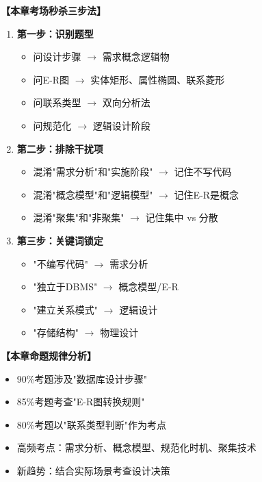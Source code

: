 \documentclass[12pt, a4paper]{article}
\newenvironment{bluebox}[1]{%
  \begin{trivlist}
  \item[\hskip\labelsep \textbf{#1}]
  \setlength{\parskip}{0.5ex}
  \setlength{\itemsep}{0.5ex}
}{%
  \end{trivlist}
  }
\begin{document}
\begin{bluebox}{考场秒杀三步法}
	\textbf{【本章考场秒杀三步法】}

	\begin{enumerate}
		\item \textbf{第一步：识别题型}
		      \begin{itemize}[nosep]
			      \item 问设计步骤 $\to$ 需求概念逻辑物
			      \item 问E-R图 $\to$ 实体矩形、属性椭圆、联系菱形
			      \item 问联系类型 $\to$ 双向分析法
			      \item 问规范化 $\to$ 逻辑设计阶段
		      \end{itemize}

		\item \textbf{第二步：排除干扰项}
		      \begin{itemize}[nosep]
			      \item 混淆"需求分析"和"实施阶段" $\to$ 记住不写代码
			      \item 混淆"概念模型"和"逻辑模型" $\to$ 记住E-R是概念
			      \item 混淆"聚集"和"非聚集" $\to$ 记住集中 vs 分散
		      \end{itemize}

		\item \textbf{第三步：关键词锁定}
		      \begin{itemize}[nosep]
			      \item "不编写代码" $\to$ 需求分析
			      \item "独立于DBMS" $\to$ 概念模型/E-R
			      \item "建立关系模式" $\to$ 逻辑设计
			      \item "存储结构" $\to$ 物理设计
		      \end{itemize}
	\end{enumerate}
\end{bluebox}

\begin{bluebox}{近年真题规律}
	\textbf{【本章命题规律分析】}

	\begin{itemize}
		\item 90\%考题涉及"数据库设计步骤"
		\item 85\%考题考查"E-R图转换规则"
		\item 80\%考题以"联系类型判断"作为考点
		\item 高频考点：需求分析、概念模型、规范化时机、聚集技术
		\item 新趋势：结合实际场景考查设计决策
	\end{itemize}
\end{bluebox}
\end{document}
